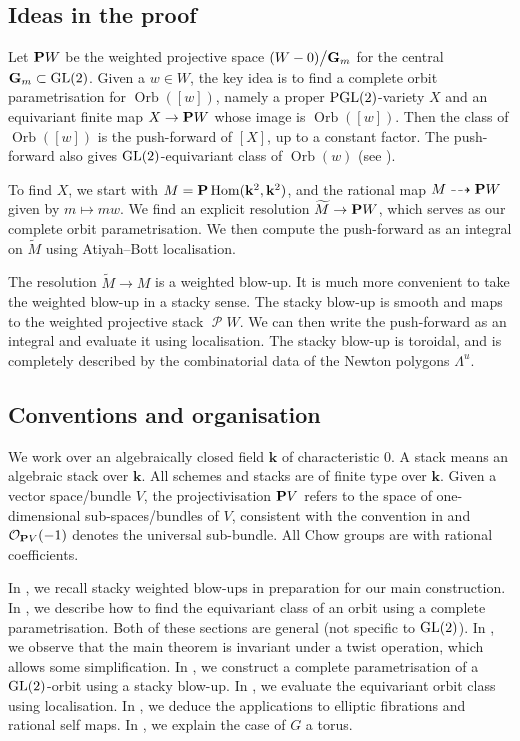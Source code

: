 \documentclass{amsart}
\renewcommand{\k}{\mathbf k}
\DeclareMathOperator{\Orb}{Orb}
\DeclareMathOperator{\sP}{\mathscr P}
\renewcommand{\O}{\mathcal O}
\begin{document}
\subsection{Ideas in the proof}
Let \(\P W\) be the weighted projective space \((W - 0)\big /\Gm\) for the central \(\Gm \subset \GL(2)\).
Given a \(w \in W\), the key idea is to find a complete orbit parametrisation for \(\Orb([w])\), namely a proper \(\PGL(2)\)-variety \(X\) and an equivariant finite map \(X \to \P W\) whose image is \(\Orb([w])\).
Then the class of \(\Orb([w])\) is the push-forward of \([X]\), up to a constant factor.
The push-forward also gives \(\GL(2)\)-equivariant class of \(\Orb(w)\) (see ).

To find \(X\), we start with \(M = \P \Hom(\k^2, \k^2)\), and the rational map \(M \dashrightarrow \P W\) given by \(m \mapsto m w\).
We find an explicit resolution \(\widetilde M \to \P W\), which serves as our complete orbit parametrisation.
We then compute the push-forward as an integral on \(\widetilde M\) using Atiyah--Bott localisation.

The resolution \(\widetilde M \to M\) is a weighted blow-up.
It is much more convenient to take the weighted blow-up in a stacky sense.
The stacky blow-up is smooth and maps to the weighted projective stack \(\sP W\).
We can then write the push-forward as an integral and evaluate it using localisation.
The stacky blow-up is toroidal, and is completely described by the combinatorial data of the Newton polygons \(\Lambda^u\).

\subsection{Conventions and organisation}
We work over an algebraically closed field \(\k\) of characteristic 0.
A stack means an algebraic stack over \(\k\).
All schemes and stacks are of finite type over \(\k\).
Given a vector space/bundle \(V\), the projectivisation \(\P V\) refers to the space of one-dimensional sub-spaces/bundles of \(V\), consistent with the convention in \cite{ful:98} and \(\O_{\P V}(-1)\) denotes the universal sub-bundle.
All Chow groups are with rational coefficients.

In , we recall stacky weighted blow-ups in preparation for our main construction.
In , we describe how to find the equivariant class of an orbit using a complete parametrisation.
Both of these sections are general (not specific to \(\GL(2)\)).
In , we observe that the main theorem is invariant under a twist operation, which allows some simplification.
In , we construct a complete parametrisation of a \(\GL(2)\)-orbit using a stacky blow-up.
In , we evaluate the equivariant orbit class using localisation.
In , we deduce the applications to elliptic fibrations and rational self maps.
In , we explain the case of \(G\) a torus.
\end{document}
